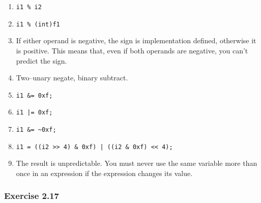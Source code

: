    \begin{enumerate}
    \item \texttt{i1 \% i2}
    \item \texttt{i1 \% (int)f1}

    \item If either operand is negative, the sign is implementation defined,
     otherwise it is positive. This means that, even if both operands are
     negative, you can't predict the sign.

    \item Two--unary negate, binary subtract.

    \item \texttt{i1 \&= 0xf;}
    \item \texttt{i1 |= 0xf;}
    \item \texttt{i1 \&= \~{}0xf;}
    \item \texttt{i1 = ((i2 >{}> 4) \& 0xf) | ((i2 \& 0xf) <{}< 4);}

    \item The result is unpredictable. You must never use the same variable more
     than once in an expression if the expression changes its value.
   \end{enumerate}

  

  \subsubsection*{Exercise 2.17}

